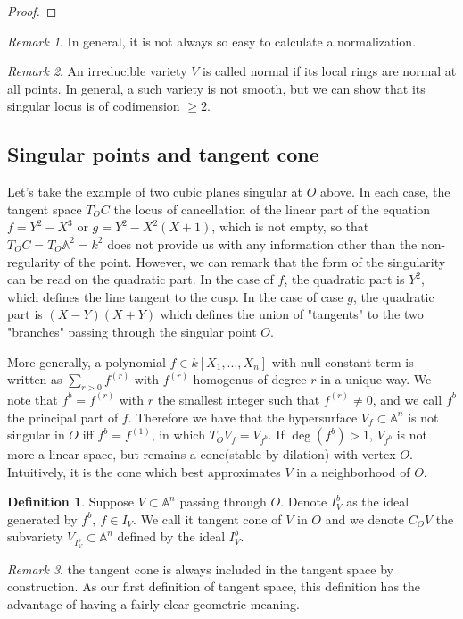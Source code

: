 \documentclass[12pt,a4paper,english]{article}
\theoremstyle{plain}
\theoremstyle{definition}
\newtheorem{defi}{Definition}
\theoremstyle{remark}
\newtheorem*{rem}{Remark}
\begin{document}
\begin{tcolorbox}
\begin{proof}

\end{proof}
\end{tcolorbox}
\begin{rem}
In general, it is not always so easy to calculate a normalization. 
\end{rem}
\begin{rem}
An irreducible variety $V$ is called normal if its local rings are normal at all points. In general, a such variety is not smooth, but we can show that its singular locus is of codimension $\geq
2$.
\end{rem}
\subsection{Singular points and tangent cone}
Let's take the example of two cubic planes singular at $O$ above. In each case, the tangent space $T_{O}C$ the locus of cancellation of the linear part of the equation $f=Y^{2}-X^{3}$ or $g=Y^{2}-X^{2}(X+1)$, which is not empty, so that $T_{O}C=T_{O}\mathbb{A}^{2}=k^{2}$ does not provide us with any information other than the non-regularity of the point. However, we can remark that the form of the singularity can be read on the quadratic part. In the case of $f$, the quadratic part is $Y^{2}$, which defines the line tangent to the cusp. In the case of case $g$, the quadratic part is $(X-Y)(X+Y)$ which defines the union of "tangents" to the two "branches" passing through the singular point $O$. 

More generally, a polynomial $f\in k[X_{1},...,X_{n}]$ with null constant term is written as $\sum_{r>0}f^{(r)}$ with $f^{(r)}$ homogenus of degree $r$ in a unique way. We note that $f^{b}=f^{(r)}$ with $r$ the smallest integer such that $f^(r)\not=0$, and we call $f^{b}$ the principal part of $f$. Therefore we have that the hypersurface $V_{f}\subset \mathbb{A}^{n}$ is not singular in $O$ iff $f^{b}=f^{(1)}$, in which $T_{O}V_{f}=V_{f^{b}}$. If $\deg(f^{b})>1$, $V_{f^{b}}$ is not more a linear space, but remains a cone(stable by dilation)  with vertex  $O$. Intuitively, it is the cone which best approximates $V$ in a neighborhood of $O$. 

\begin{defi}
Suppose $V\subset \mathbb{A}^{n}$ passing through $O$. Denote $I^{b}_{V}$ as the ideal generated by $f^{b},\ f\in I_{V}$.  We call it tangent cone of $V$ in $O$ and we denote $C_{O}V$ the subvariety $V_{I^{b}_{V}}\subset \mathbb{A}^{n}$ defined by the ideal $I^{b}_{V}$.
\end{defi}
\begin{rem}
the tangent cone is always included in the tangent space by construction. As our first definition of tangent space, this definition has the advantage of having a fairly clear geometric meaning.
\end{rem}
\end{document}
